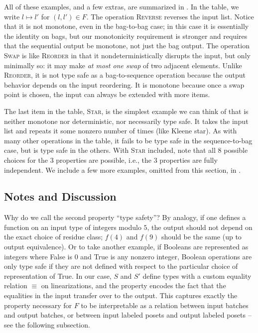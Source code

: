 All of these examples, and a few extras, are summarized in .
In the table, we write $l \mapsto l'$ for $(l, l') \in F$.
The operation \textsc{Reverse} reverses the input list.
Notice that it is not monotone, even in the bag-to-bag case;
in this case it is essentially the identity on bags, but our monotonicity
requirement is stronger and requires that the sequential output be monotone,
not just the bag output.
The operation \textsc{Swap} is like \textsc{Reorder} in that it nondeterministically disrupts the input, but only minimally so: it may make \emph{at most one swap} of two adjacent elements.
Unlike \textsc{Reorder}, it is not type safe as a bag-to-sequence operation because the output behavior depends on the input reordering.
It is monotone because once a swap point is chosen, the input can always be extended with more items.

The last item in the table, \textsc{Star}, is the simplest example we can think of that is neither monotone nor deterministic, nor necessarily type safe.
It takes the input list and repeats it some nonzero number of times (like Kleene star). As with many other operations in the table, it fails to be type safe in the sequence-to-bag case, but is type safe in the others.
With \textsc{Star} included, note that all 8 possible choices for the 3 properties are possible, i.e., the 3 properties are fully independent.
We include a few more examples, omitted from this section, in .

\subsection{Notes and Discussion}

Why do we call the second property ``type safety''? By analogy, if one defines a function on an input type of integers modulo $5$, the output should not depend on the exact choice of residue class; $f(4)$ and $f(9)$ should be the same (up to output equivalence). Or to take another example, if Booleans are represented as integers where False is $0$ and True is any nonzero integer, Boolean operations are only type safe if they are not defined with respect to the particular choice of representation of True. In our case, $S$ and $S'$ define types with a custom equality relation $\equiv$ on linearizations, and the property encodes the fact that the equalities in the input transfer over to the output. This captures exactly the property necessary for $F$ to be interpretable as a relation between input batches and output batches, or between input labeled posets and output labeled posets -- see the following subsection.


